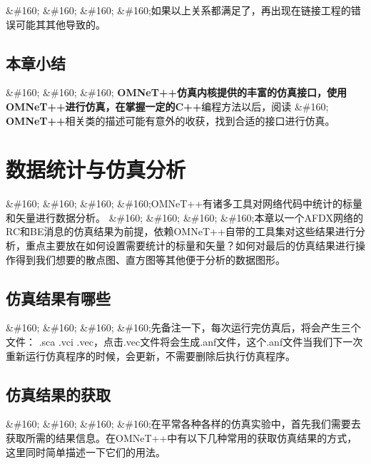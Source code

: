 \&\#160; \&\#160; \&\#160; \&\#160;如果以上关系都满足了，再出现在链接工程的错误可能其其他导致的。

\section{本章小结}
\label{本章小结}

\&\#160; \&\#160; \&\#160; \textbf{OMNeT++\textbf{仿真内核提供的丰富的仿真接口，使用}OMNeT++\textbf{进行仿真，在掌握一定的}C++}编程方法以后，阅读 \&\#160; \textbf{OMNeT++}相关类的描述可能有意外的收获，找到合适的接口进行仿真。

\chapter{数据统计与仿真分析}
\label{数据统计与仿真分析}

\&\#160; \&\#160; \&\#160; \&\#160;OMNeT++有诸多工具对网络代码中统计的标量和矢量进行数据分析。
\&\#160; \&\#160; \&\#160; \&\#160;本章以一个AFDX网络的RC和BE消息的仿真结果为前提，依赖OMNeT++自带的工具集对这些结果进行分析，重点主要放在如何设置需要统计的标量和矢量？如何对最后的仿真结果进行操作得到我们想要的散点图、直方图等其他便于分析的数据图形。

\section{仿真结果有哪些}
\label{仿真结果有哪些}

\&\#160; \&\#160; \&\#160; \&\#160;先备注一下，每次运行完仿真后，将会产生三个文件：
.sca .vci .vec，点击.vec文件将会生成.anf文件，这个.anf文件当我们下一次重新运行仿真程序的时候，会更新，不需要删除后执行仿真程序。

\section{仿真结果的获取}
\label{仿真结果的获取}

\&\#160; \&\#160; \&\#160; \&\#160;在平常各种各样的仿真实验中，首先我们需要去获取所需的结果信息。在OMNeT++中有以下几种常用的获取仿真结果的方式，这里同时简单描述一下它们的用法。

